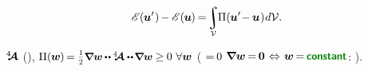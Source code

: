 \nopagebreak\vspace{-0.2em}\begin{equation*}
\potentialenergyfunctional \hspace{.16ex} (\hspace{-0.1ex}\bm{u}'\hspace{.1ex}) \hspace{-0.2ex} -
\potentialenergyfunctional \hspace{.16ex} (\hspace{-0.1ex}\bm{u}\hspace{-0.1ex}) \hspace{-0.2ex}
= \hspace{-0.3ex}
\scalebox{0.9}{$\displaystyle\integral\displaylimits_{\mathcal{V}}$} \hspace{-0.22ex}
\potential(\hspace{-0.1ex}\bm{u}' \hspace{-0.4ex} - \hspace{-0.1ex} \bm{u}\hspace{.1ex})
\hspace{.1ex} d\mathcal{V}
.
\end{equation*}

 $\hspace{.08ex}{^4\hspace{-0.72ex}\bm{\mathcal{A}}}\hspace{.08ex}$  (),
${\potential(\hspace{-0.1ex}\bm{w}\hspace{-0.1ex}) \hspace{-0.25ex} = \smallerdisplaystyleonehalf \scalebox{0.95}{$\boldnabla \bm{w} \hspace{-0.1ex} \dotdotp \hspace{-0.1ex} \stiffnesstensor \dotdotp \hspace{-0.25ex} \boldnabla \bm{w}$} \hspace{-0.1ex} \geq \hspace{-0.1ex} 0 \hspace{.8ex} \forall \bm{w}}$
( ${= \hspace{-0.2ex} 0}$  ${\boldnabla \bm{w} \hspace{-0.2ex} = \hspace{-0.2ex} \bm{0} \hspace{.2ex}\Leftrightarrow\hspace{.2ex} \bm{w} \hspace{-0.2ex} = \hspace{-0.2ex} \boldconstant}$:   ).

